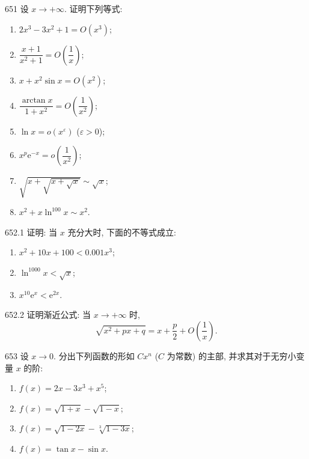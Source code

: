 \begin{prob}[L]{651}
设 $x \to +\infty$. 证明下列等式:
\begin{enumerate}[label=(\alph*), itemsep=2pt, topsep=3pt]
  \item $2x^3 - 3x^2 + 1 = O(x^3)$;
  \item $\dfrac{x + 1}{x^2 + 1} = O\left(\dfrac{1}{x}\right)$;
  \item $x + x^2\sin x = O(x^2)$;
  \item $\dfrac{\arctan x}{1 + x^2} = O\left(\dfrac{1}{x^2}\right)$;
  \item $\ln x = o(x^\varepsilon)$ ($\varepsilon > 0$);
  \item $x^p \mathrm{e}^{-x} = o\left(\dfrac{1}{x^2}\right)$;
  \item $\sqrt{x + \sqrt{x + \sqrt{x}}} \sim \sqrt{x}$;
  \item $x^2 + x\ln^{100} x \sim x^2$.
\end{enumerate}
\end{prob}

\begin{prob}[L]{652.1}
证明: 当 $x$ 充分大时, 下面的不等式成立:
\begin{enumerate}[label=(\alph*), itemsep=2pt, topsep=3pt]
  \item $x^2 + 10x + 100 < 0.001x^3$;
  \item $\ln^{1000} x < \sqrt{x}$;
  \item $x^{10}\mathrm{e}^x < \mathrm{e}^{2x}$.
\end{enumerate}
\end{prob}

\begin{prob}[M]{652.2}
证明渐近公式: 当 $x \to +\infty$ 时,
\[
  \sqrt{x^2 + px + q} = x + \frac{p}{2} + O\left(\frac{1}{x}\right).
\]
\end{prob}

\begin{prob}[L]{653}
设 $x \to 0$. 分出下列函数的形如 $Cx^n$ ($C$ 为常数) 的主部, 并求其对于无穷小变量 $x$ 的阶:
\begin{enumerate}[label=(\alph*), itemsep=2pt, topsep=3pt]
  \item $f(x) = 2x - 3x^3 + x^5$;
  \item $f(x) = \sqrt{1 + x} - \sqrt{1 - x}$;
  \item $f(x) = \sqrt{1 - 2x} - \sqrt[3]{1 - 3x}$;
  \item $f(x) = \tan x - \sin x$.
\end{enumerate}
\end{prob}


